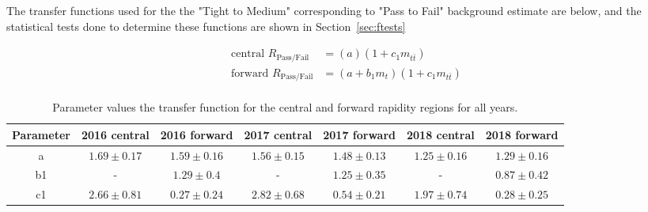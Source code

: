 The transfer functions used for the  the "Tight to Medium" corresponding to "Pass to Fail" background estimate are below, and the statistical tests done to determine these functions are shown in Section~\ref{sec:ftests}
%
%

\begin{equation}
\begin{aligned}
\text{central } R_{\text{Pass/Fail}} &= (a) (1 + c_{1} m_{t\bar{t}}) \\
\text{forward } R_{\text{Pass/Fail}} &= (a + b_{1} m_{t}) (1 + c_{1} m_{t\bar{t}}) \\
\end{aligned}
\label{eq:transfer}
\end{equation}


\begin{table}[!htbp]
    \centering
    \begin{tabular}{| c | c | c | c | c | c | c | }
        \hline
        \textbf{Parameter} & \textbf{2016 central}  & \textbf{2016 forward} & \textbf{2017 central}  & \textbf{2017 forward} & \textbf{2018 central}  & \textbf{2018 forward}  \\
        \hline
	a & $1.69 \pm 0.17$  & $1.59 \pm 0.16$  & $1.56 \pm 0.15$  & $1.48 \pm 0.13$  & $1.25 \pm 0.16$  & $1.29 \pm 0.16$ \\
	b1 & -   & $1.29 \pm 0.4$  & -   & $1.25 \pm 0.35$  & -   & $0.87 \pm 0.42$ \\
	c1 & $2.66 \pm 0.81$  & $0.27 \pm 0.24$  & $2.82 \pm 0.68$  & $0.54 \pm 0.21$  & $1.97 \pm 0.74$  & $0.28 \pm 0.25$ \\
        \hline
    \end{tabular}
    \caption{Parameter values the transfer function for the central and forward rapidity regions for all years.}
    \label{tab:transfer_all}
\end{table}




